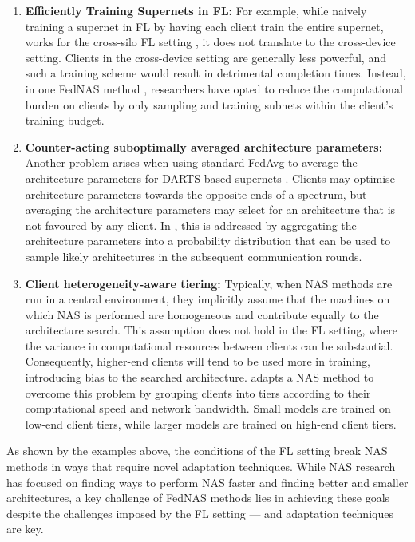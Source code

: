 \begin{enumerate}
    \item \textbf{Efficiently Training Supernets in FL:} For example, while naively training a supernet in FL by having each client train the entire supernet, works for the cross-silo FL setting \cite{fednas_2021}, it does not translate to the cross-device setting. Clients in the cross-device setting are generally less powerful, and such a training scheme would result in detrimental completion times. Instead, in one FedNAS method \cite{fedoras_2022}, researchers have opted to reduce the computational burden on clients by only sampling and training subnets within the client's training budget.
    \item \textbf{Counter-acting suboptimally averaged architecture parameters:} Another problem arises when using standard FedAvg to average the architecture parameters for DARTS-based supernets \cite{darts_2019}. Clients may optimise architecture parameters towards the opposite ends of a spectrum, but averaging the architecture parameters may select for an architecture that is not favoured by any client. In \cite{efnas_2024}, this is addressed by aggregating the architecture parameters into a probability distribution that can be used to sample likely architectures in the subsequent communication rounds.
    \item \textbf{Client heterogeneity-aware tiering:} Typically, when NAS methods are run in a central environment, they implicitly assume that the machines on which NAS is performed are homogeneous and contribute equally to the architecture search. This assumption does not hold in the FL setting, where the variance in computational resources between clients can be substantial. Consequently, higher-end clients will tend to be used more in training, introducing bias to the searched architecture. \cite{network_aware_fed_nas_2025} adapts a NAS method to overcome this problem by grouping clients into tiers according to their computational speed and network bandwidth. Small models are trained on low-end client tiers, while larger models are trained on high-end client tiers.
\end{enumerate}

As shown by the examples above, the conditions of the FL setting break NAS methods in ways that require novel adaptation techniques. While NAS research has focused on finding ways to perform NAS faster and finding better and smaller architectures, a key challenge of FedNAS methods lies in achieving these goals despite the challenges imposed by the FL setting — and adaptation techniques are key. 

